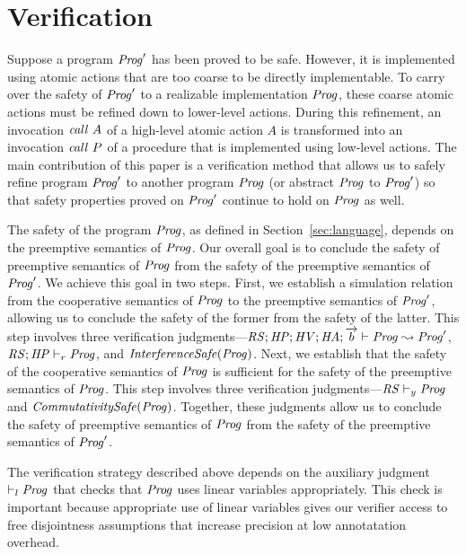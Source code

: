 \section{Verification}
\label{sec:verification}

Suppose a program $\mathit{Prog}'$ has been proved to be safe.
However, it is implemented using atomic actions that are too coarse to be directly implementable.  
To carry over the safety of $\mathit{Prog}'$ to a realizable implementation $\mathit{Prog}$, 
these coarse atomic actions must be refined down to lower-level actions.
During this refinement, an invocation $\mathit{call}\ A$ of a high-level atomic action $A$ is transformed into an 
invocation $\mathit{call}\ P$ of a procedure that is implemented using low-level actions.
The main contribution of this paper is a verification method that allows us to safely refine
program $\mathit{Prog}'$ to another program $\mathit{Prog}$ (or abstract $\mathit{Prog}$ to $\mathit{Prog}'$) so that 
safety properties proved on $\mathit{Prog}'$ continue to hold on $\mathit{Prog}$ as well.

The safety of the program $\mathit{Prog}$, as defined in Section~\ref{sec:language}, depends on 
the preemptive semantics of $\mathit{Prog}$.
Our overall goal is to conclude the safety of preemptive semantics of $\mathit{Prog}$
from the safety of the preemptive semantics of $\mathit{Prog}'$.
We achieve this goal in two steps.
First, we establish a simulation relation from the cooperative semantics of $\mathit{Prog}$ 
to the preemptive semantics of $\mathit{Prog}'$,
allowing us to conclude the safety of the former from the safety of the latter.
This step involves three verification judgments---$\mathit{RS};\mathit{HP};\mathit{HV};\mathit{HA};\overrightarrow{b} \vdash \mathit{Prog} \leadsto \mathit{Prog}'$,
$\mathit{RS};\mathit{HP} \vdash_r \mathit{Prog}$, and $\mathit{InterferenceSafe}(\mathit{Prog})$.
Next, we establish that the safety of the cooperative semantics of $\mathit{Prog}$ is 
sufficient for the safety of the preemptive semantics of $\mathit{Prog}$.
This step involves three verification judgments---$\mathit{RS} \vdash_y \mathit{Prog}$ and $\mathit{CommutativitySafe}(\mathit{Prog})$.
Together, these judgments allow us to conclude the safety of preemptive semantics of $\mathit{Prog}$
from the safety of the preemptive semantics of $\mathit{Prog}'$.

The verification strategy described above depends on the auxiliary judgment $\vdash_l \mathit{Prog}$ that
checks that $\mathit{Prog}$ uses linear variables appropriately.
This check is important because appropriate use of linear variables gives our verifier access to free disjointness
assumptions that increase precision at low annotatation overhead.

